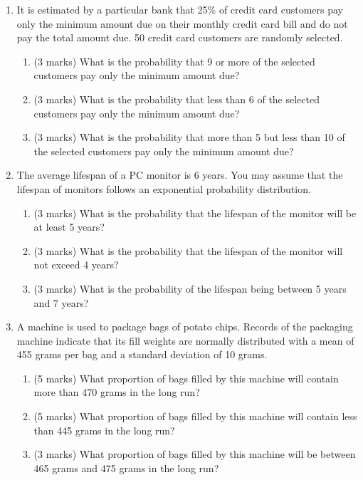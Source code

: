 \begin{enumerate}
\begin{enumerate}
		
		\item It is estimated by a particular bank that 25\% of credit card customers pay only the minimum amount due on their monthly credit card bill and do not pay the total amount due. 50 credit card customers are randomly selected.
		\begin{enumerate}
			\item (3 marks)	What is the probability that 9 or more of the selected customers pay only the minimum amount due?
			\item (3 marks) What is the probability that less than 6 of the selected customers pay only the minimum amount due?
			\item (3 marks)	What is the probability that more than 5 but less than 10 of the selected customers pay only the minimum amount due?
		\end{enumerate}
		
		
		
		\vspace{0.25cm}
		\item The average lifespan of a PC monitor is 6 years. You may assume that the lifespan of monitors follows an exponential probability distribution.
		\begin{enumerate}
			\item (3 marks) What is the probability that the lifespan of the monitor will be at least 5 years?
			\item (3 marks) What is the probability that the lifespan of the monitor will not exceed 4 years?
			\item (3 marks) What is the probability of the lifespan being between 5 years and 7 years?
		\end{enumerate}
		\vspace{0.25cm}
		\item A machine is used to package bags of potato chips.  Records of the packaging machine indicate that its fill weights are normally distributed with a mean of 455 grams per bag and a standard deviation of 10 grams.
		
		\begin{enumerate}
			\item (5 marks) What proportion of bags filled by this machine will contain more than 470 grams in the long run?
			\item (5 marks)	What proportion of bags filled by this machine will contain less than 445 grams in the long run?
			\item (3 marks)	What proportion of bags filled by this machine will be between 465 grams and 475 grams in the long run?
		\end{enumerate}
	\end{enumerate}
	
	
	
\end{enumerate}
\newpage

